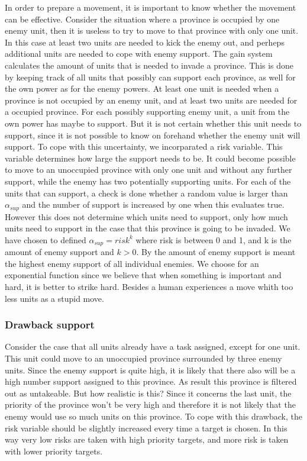 \documentclass[a4paper]{article} %
\begin{document}
In order to prepare a movement, it is important to know whether the movement can be effective. Consider the situation where a province is occupied by one enemy unit, then it is useless to try to move to that province with only one unit. In this case at least two units are needed to kick the enemy out, and perheps additional units are needed to cope with enemy support. The gain system calculates the amount of units that is needed to invade a province. This is done by keeping track of all units that possibly can support each province, as well for the own power as for the enemy powers. At least one unit is needed when a province is not occupied by an enemy unit, and at least two units are needed for a occupied province. For each possibly supporting enemy unit, a unit from the own power has maybe to support. But it is not certain whether this unit needs to support, since it is not possible to know on forehand whether the enemy unit will support. To cope with this uncertainty, we incorparated a risk variable. This variable determines how large the support needs to be. It could become possible to move to an unoccupied province with only one unit and without any further support, while the enemy has two potentially supporting units. For each of the units that can support, a check is done whether a random value is larger than $\alpha_{sup}$ and the number of support is increased by one when this evaluates true. However this does not determine which units need to support, only how much units need to support in the case that this province is going to be invaded. We have chosen to defined $\alpha_{sup} = risk^{k}$ where risk is between 0 and 1, and k is the amount of enemy support and $k>0$. By the amount of enemy support is meant the highest enemy support of all individual enemies. We choose for an exponential function since we believe that when something is important and hard, it is better to strike hard. Besides a human experiences a move whith too less units as a stupid move. 

\subsubsection{Drawback support}
Consider the case that all units already have a task assigned, except for one unit. This unit could move to an unoccupied province surrounded by three enemy units. Since the enemy support is quite high, it is likely that there also will be a high number support assigned to this province. As result this province is filtered out as untakeable. But how realistic is this? Since it concerns the last unit, the priority of the province won't be very high and therefore it is not likely that the enemy would use so much units on this province. To cope with this drawback, the risk variable should be slightly increased every time a target is chosen. In this way very low risks are taken with high priority targets, and more risk is taken with lower priority targets. 
\end{document}

